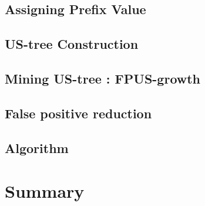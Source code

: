 \documentclass[a4paper,12pt]{book}
\begin{document}
\subsection{Assigning Prefix Value}



\subsection{US-tree Construction}

\subsection{Mining US-tree : FPUS-growth}

\subsection{False positive reduction}

\subsection{Algorithm}

\newpage
\section{Summary}

\end{document}
